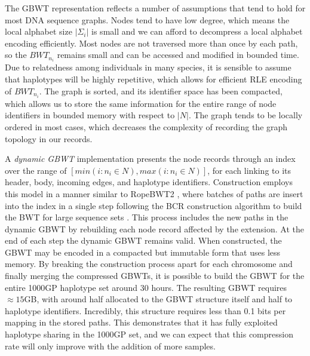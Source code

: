 The GBWT representation reflects a number of assumptions that tend to hold for most DNA sequence graphs.
Nodes tend to have low degree, which means the local alphabet size $|\Sigma_i|$ is small and we can afford to decompress a local alphabet encoding efficiently.
Most nodes are not traversed more than once by each path, so the $BWT_{n_i}$ remains small and can be accessed and modified in bounded time.
Due to relatedness among individuals in many species, it is sensible to assume that haplotypes will be highly repetitive, which allows for efficient RLE encoding of $BWT_{n_i}$.
The graph is sorted, and its identifier space has been compacted, which allows us to store the same information for the entire range of node identifiers in bounded memory with respect to $|N|$.
The graph tends to be locally ordered in most cases, which decreases the complexity of recording the graph topology in our records.



A \emph{dynamic GBWT} implementation presents the node records through an index over the range of $[min(i : n_i \in N), max(i : n_i \in N)]$, for each linking to its header, body, incoming edges, and haplotype identifiers.
Construction employs this model in a manner similar to RopeBWT2 \cite{li2014fast}, where batches of paths are insert into the index in a single step following the BCR construction algorithm to build the BWT for large sequence sets \cite{bauer2013lightweight}.
This process includes the new paths in the dynamic GBWT by rebuilding each node record affected by the extension.
At the end of each step the dynamic GBWT remains valid.
When constructed, the GBWT may be encoded in a compacted but immutable form that uses less memory.
By breaking the construction process apart for each chromosome and finally merging the compressed GBWTs, it is possible to build the GBWT for the entire 1000GP haplotype set around 30 hours.
The resulting GBWT requires $\approx 15$GB, with around half allocated to the GBWT structure itself and half to haplotype identifiers.
Incredibly, this structure requires less than 0.1 bits per mapping in the stored paths.
This demonstrates that it has fully exploited haplotype sharing in the 1000GP set, and we can expect that this compression rate will only improve with the addition of more samples.

